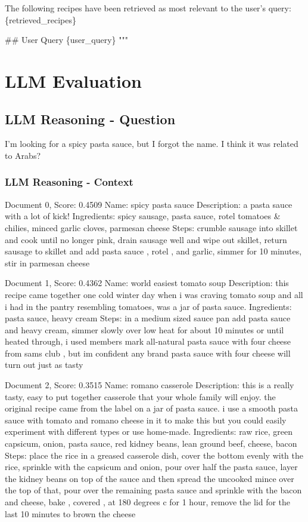 \documentclass[a4paper,11pt]{article}
\begin{document}
The following recipes have been retrieved as most relevant to the user's query:
\{retrieved\_recipes\}   

\#\# User Query
\{user\_query\}
"""



\section{LLM Evaluation}

\subsection{LLM Reasoning - Question}
I'm looking for a spicy pasta sauce, but I forgot the name. I think it was related to Arabs?

\subsubsection{LLM Reasoning - Context}
Document 0, Score: 0.4509
Name: spicy pasta sauce
Description: a pasta sauce with a lot of kick!
Ingredients: spicy sausage, pasta sauce, rotel tomatoes \& chilies, minced garlic cloves, parmesan cheese
Steps: crumble sausage into skillet and cook until no longer pink, drain sausage well and wipe out skillet, return sausage to skillet and add pasta sauce , rotel , and garlic, simmer for 10 minutes, stir in parmesan cheese

Document 1, Score: 0.4362
Name: world easiest tomato soup
Description: this recipe came together one cold winter day when i was craving tomato soup and all i had in the pantry resembling tomatoes, was a jar of pasta sauce.
Ingredients: pasta sauce, heavy cream
Steps: in a medium sized sauce pan add pasta sauce and heavy cream, simmer slowly over low heat for about 10 minutes or until heated through, i used members mark all-natural pasta sauce with four cheese from sams club , but im confident any brand pasta sauce with four cheese will turn out just as tasty

Document 2, Score: 0.3515
Name: romano casserole
Description: this is a really tasty, easy to put together casserole that your whole family will enjoy. the original recipe came from the label on a jar of pasta sauce. i use a smooth pasta sauce with tomato and romano cheese in it to make this but you could easily experiment with different types or use home-made.
Ingredients: raw rice, green capsicum, onion, pasta sauce, red kidney beans, lean ground beef, cheese, bacon
Steps: place the rice in a greased casserole dish, cover the bottom evenly with the rice, sprinkle with the capsicum and onion, pour over half the pasta sauce, layer the kidney beans on top of the sauce and then spread the uncooked mince over the top of that, pour over the remaining pasta sauce and sprinkle with the bacon and cheese, bake , covered , at 180 degrees c for 1 hour, remove the lid for the last 10 minutes to brown the cheese
\end{document}
